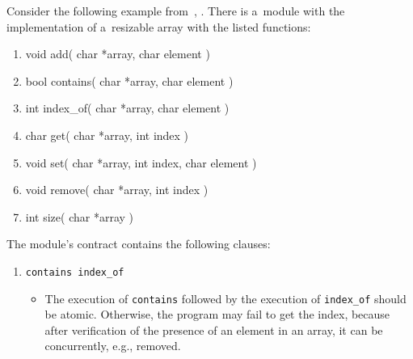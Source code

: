 \begin{example}
    Consider the following example from~\cite{contracts2017},
    \cite{contracts2015}. There is a~module with the implementation of
    a~resizable array with the listed functions:
    \begin{enumerate}[label={$ f_{\arabic*} $:}]
        \tt

        \item
            \textcolor{bluekeywords}{void} add(%
                \textcolor{bluekeywords}{char} *array,
                \textcolor{bluekeywords}{char} element%
            )

        \item
            \textcolor{bluekeywords}{bool} contains(%
                \textcolor{bluekeywords}{char} *array,
                \textcolor{bluekeywords}{char} element%
            )

        \item
            \textcolor{bluekeywords}{int} index\_of(%
                \textcolor{bluekeywords}{char} *array,
                \textcolor{bluekeywords}{char} element%
            )

        \item
            \textcolor{bluekeywords}{char} get(%
                \textcolor{bluekeywords}{char} *array,
                \textcolor{bluekeywords}{int} index%
            )

        \item
            \textcolor{bluekeywords}{void} set(%
                \textcolor{bluekeywords}{char} *array,
                \textcolor{bluekeywords}{int} index,
                \textcolor{bluekeywords}{char} element%
            )

        \item
            \textcolor{bluekeywords}{void} remove(%
                \textcolor{bluekeywords}{char} *array,
                \textcolor{bluekeywords}{int} index%
            )

        \item
            \textcolor{bluekeywords}{int} size(%
                \textcolor{bluekeywords}{char} *array%
            )
    \end{enumerate}
    The module's contract contains the following clauses:
    \begin{enumerate}[label={$ (\varrho_{\arabic*}) $}]
        \item
            \texttt{contains index\_of}
            \begin{itemize}[label=]
                \item
                    The execution of \texttt{contains} followed by the execution
                    of \texttt{index\_of} should be atomic. Otherwise, the program
                    may fail to get the index, because after verification of
                    the presence of an element in an array, it can be
                    concurrently, e.g., removed.
            \end{itemize}


\end{enumerate}
\end{example}
